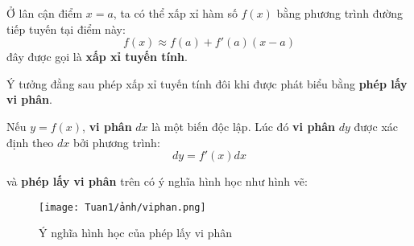 \begin{definition}
    Ở lân cận điểm $x=a$, ta có thể xấp xỉ hàm số $f(x)$ bằng phương trình đường tiếp tuyến tại điểm này:
\begin{equation}
        f(x)\approx f(a)+f'(a)(x-a)
    \end{equation}
đây được gọi là \textbf{xấp xỉ tuyến tính}.
\end{definition}
Ý tưởng đằng sau phép xấp xỉ tuyến tính đôi khi được phát biểu bằng \textbf{phép lấy vi phân}.

\begin{definition}
    Nếu $y=f(x)$, \textbf{vi phân} $dx$ là một biến độc lập. Lúc đó \textbf{vi phân} $dy$ được xác định theo $dx$ bởi phương trình:
\begin{equation}
    dy=f'(x)dx
\end{equation}
\end{definition}
và \textbf{phép lấy vi phân} trên có ý nghĩa hình học như hình vẽ:

\begin{figure}[H]
\centering
\texttt{[image: Tuan1/ảnh/viphan.png]}
\caption{Ý nghĩa hình học của phép lấy vi phân}
\end{figure}